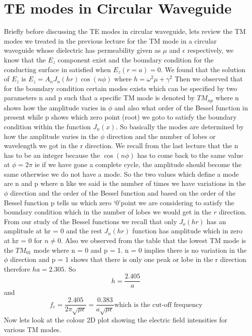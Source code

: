       \chapter{TE modes in Circular Waveguide}
      Briefly  before  discussing the TE modes in circular waveguide, lets review the TM modes we treated in the previous lecture for the TM   mode in a circular waveguide whose dielectric has permeability given as $\mu$ and $\epsilon$ respectively, we know that the $E_z$ component exist and the boundary condition for the conducting surface in satisfied when $E_z(r=a)= 0$. We found that the solution of $E_z$ is $E_z = A_n J_n(hr)\cos(n\phi)$  where $h= \omega^2\mu + \gamma^2$  Then we observed that for the boundary condition certain modes exists which can be specified by two parameters n and p such that a specific TM mode is denoted by $TM_{np}$ where n shows how the amplitude varies in $\phi$ and also what order of the Bessel function in present while p shows which zero point (root) we goto to satisfy the boundary condition within the function $J_n(x)$. So  basically the modes are determined by how the amplitude varies in the $\phi$ direction and the number of lobes or wavelength we got in the r direction. We recall from  the last lecture that the n has to be an integer because the $\cos(n\phi)$ has to come back to the same value at $\phi=2\pi$ ie if we have gone a complete cycle, the amplitude should become the same otherwise we do not have a mode. So the two values which define a mode are n and p where  n like we said is the number of times we have variations in the $\phi$ direction and the order of the Bessel function and based on the order of the Bessel function p tells us which zero \textquoteleft0\textquoteright point we are considering to satisfy the boundary condition which in the number of lobes we would get in the $r$ direction. From our study of the Bessel functions we recall that only $J_o(hr)$ has an amplitude at hr = 0 and the rest $J_n(hr)$ function has amplitude which in zero at hr = 0 for $ n \ne 0$. Also we observed from the table that the lowest TM mode is the $TM_{01}$ mode where n = 0 and p = 1.  n = 0 implies there is no variation in the $\phi$ direction and p = 1 shows that there is only one peak or lobe in the r direction therefore $ha = 2.305$. So
      $$ h = \frac{2.405}{a}$$ and $$f_c = \frac{2.405}{2\pi\sqrt{\mu\epsilon}} = \frac{0.383}{a\sqrt{\mu\epsilon}}\text{which is the cut-off frequency}$$
      Now lets look at the colour 2D plot showing the electric field intensities for various TM modes.
      
